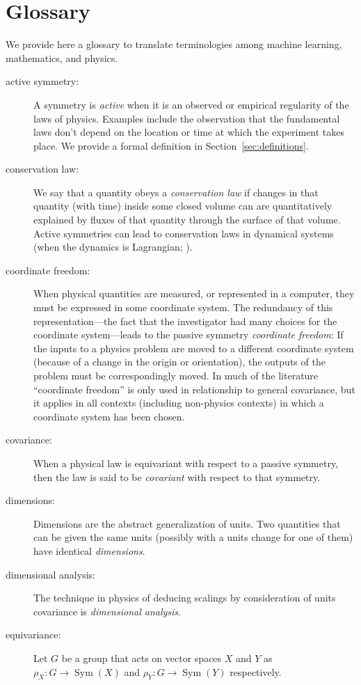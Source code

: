\documentclass[accepted]{article}
\newcommand{\sectionname}{Section}
\newcommand{\secref}[1]{\sectionname~\ref{#1}}
\begin{document}
\section{Glossary}\label{app:glossary}
We provide here a glossary to translate terminologies among machine learning, mathematics, and physics.
\begin{description}
\item[active symmetry:]
  A symmetry is \emph{active} when it is an observed or empirical regularity of the laws of physics.
  Examples include the observation that the fundamental laws don't depend on the location or time at which the experiment takes place.
  We provide a formal definition in \secref{sec:definitions}.
\item[conservation law:]
  We say that a quantity obeys a \emph{conservation law} if changes in that quantity (with time) inside some closed volume can are quantitatively explained by fluxes of that quantity through the surface of that volume.
  Active symmetries can lead to conservation laws in dynamical systems (when the dynamics is Lagrangian; \citealt{noether}).
\item[coordinate freedom:]
  When physical quantities are measured, or represented in a computer, they must be expressed in some coordinate system.
  The redundancy of this representation---the fact that the investigator had many choices for the coordinate system---leads to the passive symmetry \emph{coordinate freedom}:
  If the inputs to a physics problem are moved to a different coordinate system (because of a change in the origin or orientation), the outputs of the problem must be correspondingly moved.
  In much of the literature ``coordinate freedom'' is only used in relationship to general covariance, but it applies in all contexts (including non-physics contexts) in which a coordinate system has been chosen.
\item[covariance:]
  When a physical law is equivariant with respect to a passive symmetry, then the law is said to be \emph{covariant} with respect to that symmetry.
\item[dimensions:]
  Dimensions are the abstract generalization of units.
  Two quantities that can be given the same units (possibly with a units change for one of them) have identical \emph{dimensions}.
\item[dimensional analysis:]
  The technique in physics of deducing scalings by consideration of units covariance is \emph{dimensional analysis}.
\item[equivariance:]
  Let $G$ be a group that acts on vector spaces $X$ and $Y$ as $\rho_X:G\to \operatorname{Sym}(X)$ and $\rho_Y:G\to \operatorname{Sym}(Y)$ respectively.

\end{description}
\end{document}
